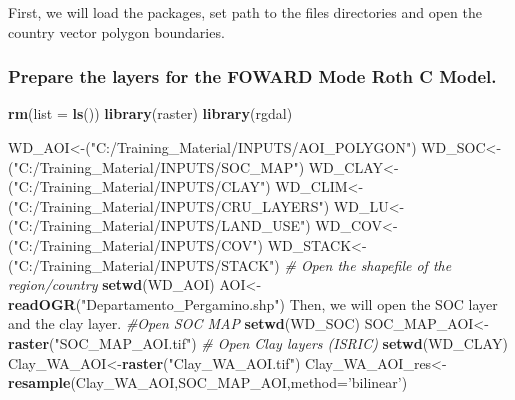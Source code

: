 \documentclass[
  10pt,
  b5paper,
]{book}
\newenvironment{Shaded}{\begin{snugshade}}{\end{snugshade}}
\newcommand{\CommentTok}[1]{\textcolor[rgb]{0.56,0.35,0.01}{\textit{#1}}}
\newcommand{\DataTypeTok}[1]{\textcolor[rgb]{0.13,0.29,0.53}{#1}}
\newcommand{\KeywordTok}[1]{\textcolor[rgb]{0.13,0.29,0.53}{\textbf{#1}}}
\newcommand{\NormalTok}[1]{#1}
\newcommand{\StringTok}[1]{\textcolor[rgb]{0.31,0.60,0.02}{#1}}
\begin{document}
First, we will load the packages, set path to the files directories and open the country vector polygon boundaries.

\hypertarget{prepare-the-layers-for-the-foward-mode-roth-c-model.}{%
\subsubsection{Prepare the layers for the FOWARD Mode Roth C Model.}\label{prepare-the-layers-for-the-foward-mode-roth-c-model.}}

\begin{Shaded}
\begin{Highlighting}[]
\KeywordTok{rm}\NormalTok{(}\DataTypeTok{list =} \KeywordTok{ls}\NormalTok{())}
\KeywordTok{library}\NormalTok{(raster)}
\KeywordTok{library}\NormalTok{(rgdal)}

\NormalTok{WD_AOI<-(}\StringTok{"C:/Training_Material/INPUTS/AOI_POLYGON"}\NormalTok{)}
\NormalTok{WD_SOC<-(}\StringTok{"C:/Training_Material/INPUTS/SOC_MAP"}\NormalTok{)}
\NormalTok{WD_CLAY<-(}\StringTok{"C:/Training_Material/INPUTS/CLAY"}\NormalTok{)}
\NormalTok{WD_CLIM<-(}\StringTok{"C:/Training_Material/INPUTS/CRU_LAYERS"}\NormalTok{)}
\NormalTok{WD_LU<-(}\StringTok{"C:/Training_Material/INPUTS/LAND_USE"}\NormalTok{)}
\NormalTok{WD_COV<-(}\StringTok{"C:/Training_Material/INPUTS/COV"}\NormalTok{)}
\NormalTok{WD_STACK<-(}\StringTok{"C:/Training_Material/INPUTS/STACK"}\NormalTok{)}
\CommentTok{# Open the shapefile of the region/country}
\KeywordTok{setwd}\NormalTok{(WD_AOI)}
\NormalTok{AOI<-}\KeywordTok{readOGR}\NormalTok{(}\StringTok{"Departamento_Pergamino.shp"}\NormalTok{)}
\NormalTok{Then, we will open the SOC layer and the clay layer.}
\CommentTok{#Open SOC MAP }
\KeywordTok{setwd}\NormalTok{(WD_SOC)}
\NormalTok{SOC_MAP_AOI<-}\KeywordTok{raster}\NormalTok{(}\StringTok{"SOC_MAP_AOI.tif"}\NormalTok{)}
\CommentTok{# Open Clay layers  (ISRIC)}
\KeywordTok{setwd}\NormalTok{(WD_CLAY)}
\NormalTok{Clay_WA_AOI<-}\KeywordTok{raster}\NormalTok{(}\StringTok{"Clay_WA_AOI.tif"}\NormalTok{)}
\NormalTok{Clay_WA_AOI_res<-}\KeywordTok{resample}\NormalTok{(Clay_WA_AOI,SOC_MAP_AOI,}\DataTypeTok{method=}\StringTok{'bilinear'}\NormalTok{) }


\end{Highlighting}
\end{Shaded}
\end{document}
